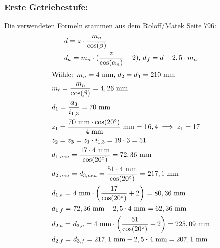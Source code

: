 \subsubsection{Erste Getriebestufe:}
Die verwendeten Formeln stammen aus dem Roloff/Matek Seite 796:
\begin{align*}
	&d= z \cdot \frac{m_n}{\cos(\beta)} \\
	&d_a = m_n \cdot (\frac{z}{\cos(\alpha_n)}+2)\text{, } d_f =d- 2,5 \cdot m_n
\end{align*}
\begin{align*}
	&\text{Wähle: } m_n= 4\text{ mm, } d_2 = d_3 = 210 \text{ mm} \\
	&m_t =  \frac{m_n}{\cos(\beta)} = 4,26 \text{ mm} \\
	&d_1 = \frac{d_3}{i_{1,3}} = 70 \text{ mm} \\
	&z_1 = \frac{70 \text{ mm} \cdot \cos(20^\circ)}{4 \text{ mm}} \text{ mm} = 16,4 \implies z_1 = 17\\
	&z_2=z_3 = z_1 \cdot i_{1,3} =19 \cdot 3 = 51 \\
	&d_{1,neu} = \frac{17 \cdot 4 \text{ mm}}{\cos(20^\circ)} = 72,36 \text{ mm} \\
	&d_{2,neu} = d_{3,neu} = \frac{51 \cdot 4 \text{ mm}}{\cos(20^\circ)} = 217,1 \text{ mm} \\
	&d_{1,a} = 4\text{ mm} \cdot \left(\frac{17}{\cos(20^\circ)}+2\right) =80,36\text{ mm} \\
	&d_{1,f} = 72,36\text{ mm} -2,5 \cdot 4\text{ mm} =62,36\text{ mm} \\
	&d_{2,a} = d_{3,a} =4\text{ mm} \cdot \left(\frac{51}{\cos(20^\circ)}+2\right) =225,09\text{ mm} \\
	&d_{2,f} =d_{3,f} = 217,1\text{ mm} -2,5 \cdot 4\text{ mm} =207,1\text{ mm} \\
\end{align*}
